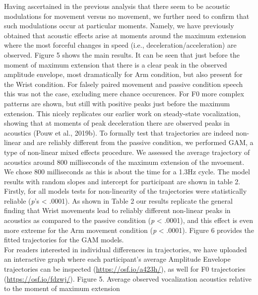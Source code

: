 \documentclass[
  man,floatsintext]{apa6}
\begin{document}
Having ascertained in the previous analysis that there seem to be acoustic modulations for movement versus no movement, we further need to confirm that such modulations occur at particular moments. Namely, we have previously obtained that acoustic effects arise at moments around the maximum extension where the most forceful changes in speed (i.e., deceleration/acceleration) are observed.
Figure 5 shows the main results. It can be seen that just before the moment of maximum extension that there is a clear peak in the observed amplitude envelope, most dramatically for Arm condition, but also present for the Wrist condition. For falsely paired movement and passive condition speech this was not the case, excluding mere chance occurences. For F0 more complex patterns are shown, but still with positive peaks just before the maximum extension. This nicely replicates our earlier work on steady-state vocalization, showing that at moments of peak deceleration there are observed peaks in acoustics (Pouw et al., 2019b).
To formally test that trajectories are indeed non-linear and are reliably different from the passive condition, we performed GAM, a type of non-linear mixed effects procedure. We assessed the average trajectory of acoustics around 800 milliseconds of the maximum extension of the mvoement. We chose 800 milliseconds as this is about the time for a 1.3Hz cycle. The model results with random slopes and intercept for participant are shown in table 2. Firstly, for all models tests for non-linearity of the trajectories were statistically reliable (\emph{p}'s \textless{} .0001). As shown in Table 2 our results replicate the general finding that Wrist movements lead to reliably different non-linear peaks in acoustics as compared to the passive condition (\emph{p} \textless{} .0001), and this effect is even more extreme for the Arm movement condition (\emph{p} \textless{} .0001). Figure 6 provides the fitted trajectories for the GAM models.\\
For readers interested in individual differences in trajectories, we have uploaded an interactive graph where each participant's average Amplitude Envelope trajectories can be inspected (\url{https://osf.io/a423h/}), as well for F0 trajectories (\url{https://osf.io/fdzwj/}).
\pagebreak
Figure 5. Average observed vocalization acoustics relative to the moment of maximum extension\\
\end{document}
